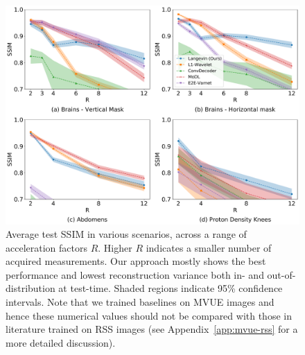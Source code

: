 \documentclass{article}
\begin{document}
\begin{figure}
    \centering
    \includegraphics[width=\columnwidth]{main-ssim-comp.pdf}
    \caption{\small Average test SSIM in various scenarios, across a range of acceleration factors $R$. Higher $R$ indicates a smaller number of acquired measurements. Our approach mostly shows the best performance and lowest reconstruction variance both in- and out-of-distribution at test-time. Shaded regions indicate 95\% confidence intervals. Note that we trained baselines on MVUE images and hence these numerical values should not be compared with those in literature trained on RSS images (see Appendix~\ref{app:mvue-rss} for a more detailed discussion).}
    \label{fig:main-ssim}
\end{figure}
\end{document}
